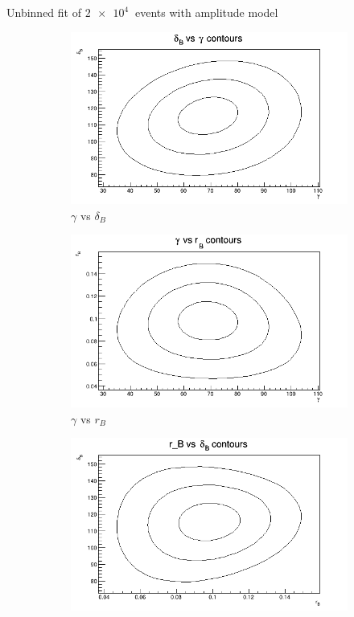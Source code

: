 \documentclass{beamer}
\begin{document}
\begin{frame}{Unbinned fit of $\SI{2e4}{}$ events with amplitude model}
  \begin{figure}
    \centering
    \vspace{-0.2cm}
    \begin{subfigure}{0.46\textwidth}
      \includegraphics[width = 1.0\textwidth]{Contour_dB_vs_gamma_1K.png}
      \caption{$\gamma$ vs $\delta_B$}
    \end{subfigure}%
    \begin{subfigure}{0.46\textwidth}
      \includegraphics[width = 1.0\textwidth]{Contour_gamma_vs_rB_1K.png}
      \caption{$\gamma$ vs $r_B$}
    \end{subfigure}
    \begin{subfigure}{0.46\textwidth}
      \includegraphics[width = 1.0\textwidth]{Contour_rB_vs_dB_1K.png}

\end{subfigure}
\end{figure}
\end{frame}
\end{document}
